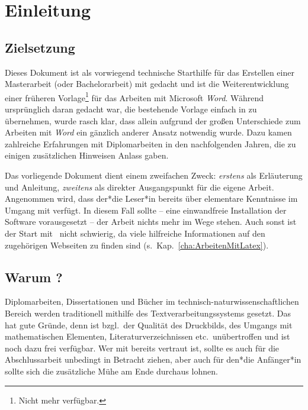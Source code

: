 \chapter{Einleitung}
\label{cha:Einleitung}

\section{Zielsetzung}
Dieses Dokument ist als vorwiegend technische Starthilfe für das
Erstellen einer Masterarbeit (oder Bachelorarbeit) mit \latex
gedacht und ist die Weiterentwicklung einer früheren
Vorlage\footnote{Nicht mehr verfügbar.} für das Arbeiten mit
Microsoft \emph{Word}. Während ursprünglich daran gedacht war, die
bestehende Vorlage einfach in \latex zu übernehmen, wurde rasch
klar, dass allein aufgrund der großen Unterschiede zum Arbeiten
mit \emph{Word} ein gänzlich anderer Ansatz notwendig wurde. Dazu
kamen zahlreiche Erfahrungen mit Diplomarbeiten in den
nachfolgenden Jahren, die zu einigen zusätzlichen Hinweisen Anlass gaben.

Das vorliegende Dokument dient einem zweifachen Zweck: 
\emph{erstens} als Erläuterung und Anleitung, \emph{zweitens} als
direkter Ausgangspunkt für die eigene Arbeit. Angenommen wird,
dass der*die Leser*in bereits über elementare Kenntnisse im Umgang mit
\latex verfügt. In diesem Fall sollte -- eine einwandfreie
Installation der Software vorausgesetzt -- der Arbeit nichts mehr
im Wege stehen. Auch sonst ist der Start mit \latex\ nicht
schwierig, da viele hilfreiche Informationen auf den zugehörigen
Webseiten zu finden sind (s.\ Kap.~\ref{cha:ArbeitenMitLatex}).





\section{Warum {\latex}?}

Diplomarbeiten, Dissertationen und Bücher im
technisch-natur\-wissen\-schaft\-lichen Bereich werden
traditionell mithilfe des Textverarbeitungssystems \latex
\cite{Lamport1994, Lamport1995} gesetzt. Das hat gute Gründe, denn
\latex ist bzgl.\ der Qualität des Druckbilds, des Umgangs mit
mathematischen Elementen, Literaturverzeichnissen etc.\
unübertroffen und ist noch dazu frei verfügbar. Wer mit \latex
bereits vertraut ist, sollte es auch für die Abschlussarbeit
unbedingt in Betracht ziehen, aber auch für den*die Anfänger*in sollte
sich die zusätzliche Mühe am Ende durchaus lohnen.

